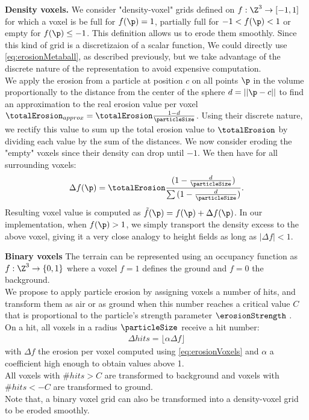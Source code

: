 \textbf{Density voxels.}
\label{sec:erosion_application_on_density_voxels}
We consider "density-voxel" grids defined on $f: \Z^3 \to [-1, 1]$ for which a voxel is be full for $f(\p) = 1$, partially full for $-1 < f(\p) < 1$ or empty for $f(\p) \leq -1$. 
This definition allows us to erode them smoothly. 
Since this kind of grid is a discretizaion of a scalar function, We could directly use \eqref{eq:erosionMetaball}, as described previously, but we take advantage of the discrete nature of the representation to avoid expensive computation. \\
We apply the erosion from a particle at position $c$ on all points $\p$ in the volume proportionally to the distance from the center of the sphere $d = ||\p - c||$ to find an approximation to the real erosion value per voxel $\totalErosion_{approx} = \totalErosion \frac{1 - d}{\particleSize}$.
Using their discrete nature, we rectify this value to sum up the total erosion value to $\totalErosion$ by dividing each value by the sum of the distances. We now consider eroding the "empty" voxels since their density can drop until $-1$. We then have for all surrounding voxels: 
\begin{align} \label{eq:erosionVoxels}
\Delta f(\p) = \totalErosion \frac{ (1 - \frac{d}{\particleSize} )}{ \sum {(1 - \frac{d}{\particleSize})}}.
\end{align}
Resulting voxel value is computed as $\Tilde{f}(\p) = f(\p) + \Delta f(\p)$.
In our implementation, when $f(\p) > 1$, we simply transport the density excess to the above voxel, giving it a very close analogy to height fields as long as $|\Delta f| < 1$. 

\textbf{Binary voxels}
\label{sec:erosion_application_on_binary_voxels}
The terrain can be represented using an occupancy function as $f: \Z^3 \to \{0, 1\}$ where a voxel $f = 1$ defines the ground and $f = 0$ the background. \\ 
We propose to apply particle erosion by assigning voxels a number of hits, and transform them as air or as ground when this number reaches a critical value $C$ that is proportional to the particle's strength parameter $\erosionStrength$ \cite{Jones2010}. \\ 
On a hit, all voxels in a radius $\particleSize$ receive a hit number: 
\begin{align} \label{eq:erosionDiscreteVoxels}
\Delta hits = \lfloor \alpha \Delta f \rfloor
\end{align}
with $\Delta f$ the erosion per voxel computed using \eqref{eq:erosionVoxels} and $\alpha$ a coefficient high enough to obtain values above 1. \\ 
All voxels with $\# hits > C$ are transformed to background and voxels with $\# hits < -C$ are transformed to ground.\\
Note that, a binary voxel grid can also be transformed into a density-voxel grid to be eroded smoothly.

